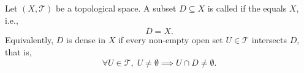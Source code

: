 \begin{definition} \label{definition:dense_subset_of_a_topological_space}
Let $(X, \mathcal{T})$ be a topological space. A subset $D \subseteq X$ is called  if the  equals $X$, i.e.,
$$\overline{D} = X.$$
Equivalently, $D$ is dense in $X$ if every non-empty open set $U \in \mathcal{T}$ intersects $D$, that is,
$$\forall U \in \mathcal{T}, \; U \neq \emptyset \implies U \cap D \neq \emptyset.$$
\end{definition}

